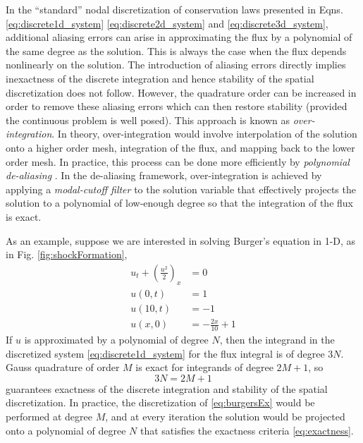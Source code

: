 \documentclass[12pt]{softwaremanual}
\begin{document}
In the ``standard'' nodal discretization of conservation laws presented in Eqns. \eqref{eq:discrete1d_system} \eqref{eq:discrete2d_system} and \eqref{eq:discrete3d_system}, additional aliasing errors can arise in approximating the flux by a polynomial of the same degree as the solution. This is always the case when the flux depends nonlinearly on the solution. The introduction of aliasing errors directly implies inexactness of the discrete integration and hence stability of the spatial discretization does not follow. However, the quadrature order can be increased in order to remove these aliasing errors which can then restore stability (provided the continuous problem is well posed). This approach is known as \textit{over-integration}. In theory, over-integration would involve interpolation of the solution onto a higher order mesh, integration of the flux, and mapping back to the lower order mesh. In practice, this process can be done more efficiently by \textit{polynomial de-aliasing} \citep{Gassner2013,Flad2016}. In the de-aliasing framework, over-integration is achieved by applying a \textit{modal-cutoff filter} to the solution variable that effectively projects the solution to a polynomial of low-enough degree so that the integration of the flux is exact.

As an example, suppose we are interested in solving Burger's equation in 1-D, as in Fig. \ref{fig:shockFormation}, 
\begin{subequations}
\begin{align}
 u_t + \left(\frac{u^2}{2}\right)_x &= 0 \\
 u(0,t) &= 1 \\
 u(10,t) &= -1 \\
 u(x,0) &= -\frac{2x}{10} + 1
\end{align}
\end{subequations}\label{eq:burgersEx}
If $u$ is approximated by a polynomial of degree $N$, then the integrand in the discretized system \eqref{eq:discrete1d_system} for the flux integral is of degree $3N$. Gauss quadrature of order $M$ is exact for integrands of degree $2M+1$, so 
\begin{equation}
3N = 2M+1 \label{eq:exactness}
\end{equation}
guarantees exactness of the discrete integration and stability of the spatial discretization. In practice, the discretization of \eqref{eq:burgersEx} would be performed at degree $M$, and at every iteration the solution would be projected onto a polynomial of degree $N$ that satisfies the exactness criteria \eqref{eq:exactness}.
\end{document}
